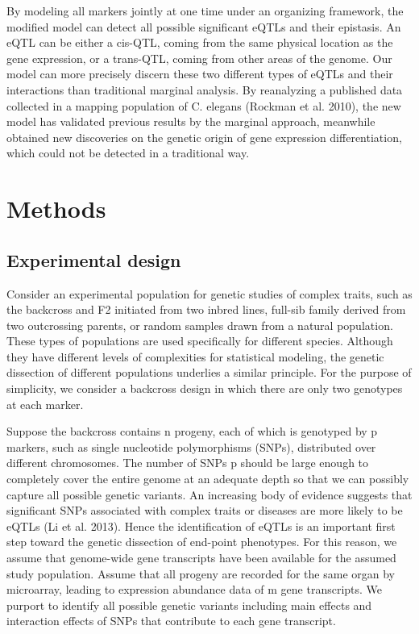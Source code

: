 \documentclass[]{book}
\theoremstyle{definition}
\theoremstyle{definition}
\theoremstyle{remark}
\begin{document}
By modeling all markers jointly at one time under an organizing
framework, the modified model can detect all possible significant eQTLs
and their epistasis. An eQTL can be either a cis-QTL, coming from the
same physical location as the gene expression, or a trans-QTL, coming
from other areas of the genome. Our model can more precisely discern
these two different types of eQTLs and their interactions than
traditional marginal analysis. By reanalyzing a published data collected
in a mapping population of C. elegans (Rockman et al. 2010), the new
model has validated previous results by the marginal approach, meanwhile
obtained new discoveries on the genetic origin of gene expression
differentiation, which could not be detected in a traditional way.

\section{Methods}\label{methods}

\subsection{Experimental design}\label{experimental-design}

Consider an experimental population for genetic studies of complex
traits, such as the backcross and F2 initiated from two inbred lines,
full-sib family derived from two outcrossing parents, or random samples
drawn from a natural population. These types of populations are used
specifically for different species. Although they have different levels
of complexities for statistical modeling, the genetic dissection of
different populations underlies a similar principle. For the purpose of
simplicity, we consider a backcross design in which there are only two
genotypes at each marker.

Suppose the backcross contains n progeny, each of which is genotyped by
p markers, such as single nucleotide polymorphisms (SNPs), distributed
over different chromosomes. The number of SNPs p should be large enough
to completely cover the entire genome at an adequate depth so that we
can possibly capture all possible genetic variants. An increasing body
of evidence suggests that significant SNPs associated with complex
traits or diseases are more likely to be eQTLs (Li et al. 2013). Hence
the identification of eQTLs is an important first step toward the
genetic dissection of end-point phenotypes. For this reason, we assume
that genome-wide gene transcripts have been available for the assumed
study population. Assume that all progeny are recorded for the same
organ by microarray, leading to expression abundance data of m gene
transcripts. We purport to identify all possible genetic variants
including main effects and interaction effects of SNPs that contribute
to each gene transcript.
\end{document}
